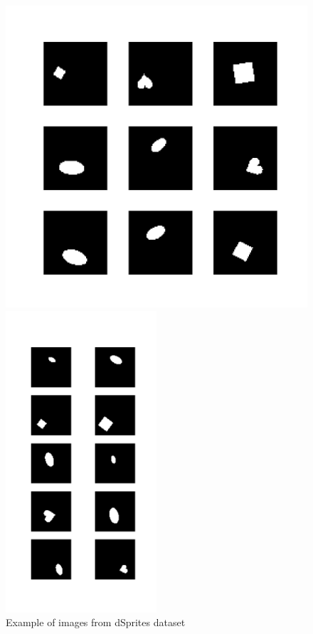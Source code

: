 \documentclass{article}
\begin{document}
    \begin{figure}[t]
        \begin{minipage}[t]{0.32\textwidth}
            \centering
            \includegraphics[width=\textwidth]{img/dsprites}
            \caption{Example of images from dSprites dataset}
            \label{fig:dsprites_example}
        \end{minipage}\hfill
        \begin{minipage}[t]{0.32\textwidth}
            \centering
            \includegraphics[width=0.5\textwidth]{img/dataset1}

\end{minipage}
\end{figure}
\end{document}

